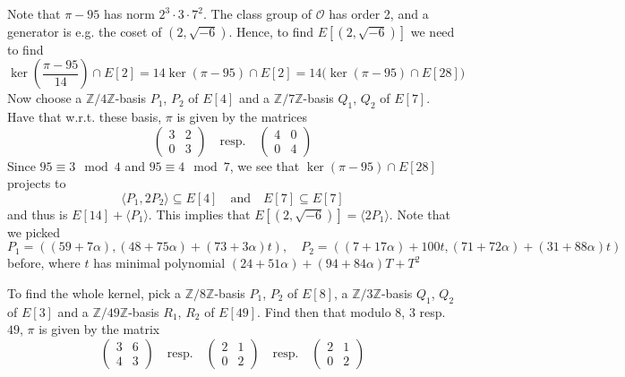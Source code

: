 \documentclass{scrartcl}
\newcommand{\Z}{\mathbb{Z}}
\renewcommand{\O}{\mathcal{O}}
\theoremstyle{definition}
\begin{document}
Note that $\pi - 95$ has norm $2^3 \cdot 3 \cdot 7^2$.
The class group of $\O$ has order 2, and a generator is e.g. the coset of $(2, \sqrt{-6})$.
Hence, to find $E[(2, \sqrt{-6})]$ we need to find
\begin{equation*}
    \ker\left( \frac {\pi - 95} {14} \right) \cap E[2] = 14\ker(\pi - 95) \cap E[2] = 14 \bigl( \ker(\pi - 95) \cap E[28] \bigr)
\end{equation*}
Now choose a $\Z/4\Z$-basis $P_1$, $P_2$ of $E[4]$ and a $\Z/7\Z$-basis $Q_1$, $Q_2$ of $E[7]$.
Have that w.r.t. these basis, $\pi$ is given by the matrices
\begin{equation*}
    \left(\begin{matrix*}
        3 & 2 \\ 0 & 3
    \end{matrix*}\right) \quad \text{resp.} \quad \left(\begin{matrix*}
        4 & 0 \\ 0 & 4
    \end{matrix*}\right)
\end{equation*}
Since $95 \equiv 3 \mod 4$ and $95 \equiv 4 \mod 7$, we see that $\ker(\pi - 95) \cap E[28]$ projects to
\begin{equation*}
    \langle P_1, 2P_2 \rangle \subseteq E[4] \quad \text{and} \quad E[7] \subseteq E[7]
\end{equation*}
and thus is $E[14] + \langle P_1 \rangle$.
This implies that $E[(2, \sqrt{-6})] = \langle 2P_1 \rangle$.
Note that we picked
\begin{equation*}
    P_1 = ((59 + 7\alpha), (48 + 75\alpha) + (73 + 3\alpha)t), \quad P_2 = ((7 + 17\alpha) + 100t, (71 + 72\alpha) + (31 + 88\alpha)t)
\end{equation*}
before, where $t$ has minimal polynomial $(24 + 51\alpha) + (94 + 84\alpha) T + T^2$

To find the whole kernel, pick a $\Z/8\Z$-basis $P_1$, $P_2$ of $E[8]$, a $\Z/3\Z$-basis $Q_1$, $Q_2$ of $E[3]$ and a $\Z/49\Z$-basis $R_1$, $R_2$ of $E[49]$.
Find then that modulo $8$, $3$ resp. $49$, $\pi$ is given by the matrix
\begin{equation*}
    \left(\begin{matrix*}
        3 & 6 \\ 4 & 3
    \end{matrix*}\right) \quad \text{resp.} \quad \left(\begin{matrix*}
        2 & 1 \\ 0 & 2
    \end{matrix*}\right) \quad \text{resp.} \quad \left(\begin{matrix*}
        2 & 1 \\ 0 & 2
    \end{matrix*}\right)
\end{equation*}
\end{document}
